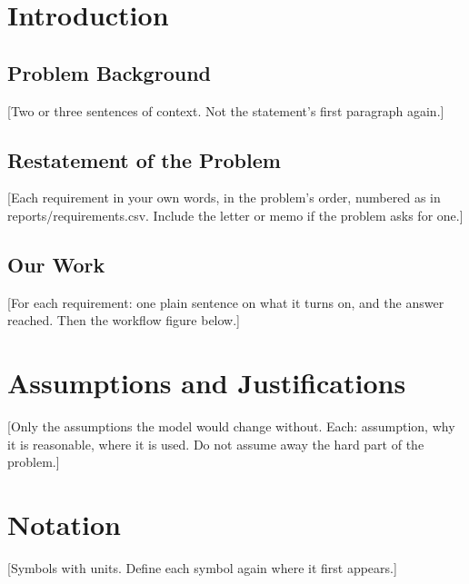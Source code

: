 \documentclass[12pt]{article}
\begin{document}
\section{Introduction}
\subsection{Problem Background}
[Two or three sentences of context. Not the statement's first paragraph again.]

\subsection{Restatement of the Problem}
[Each requirement in your own words, in the problem's order, numbered as in
reports/requirements.csv. Include the letter or memo if the problem asks for one.]

\subsection{Our Work}
[For each requirement: one plain sentence on what it turns on, and the answer reached.
Then the workflow figure below.]


\section{Assumptions and Justifications}
[Only the assumptions the model would change without. Each: assumption, why it is
reasonable, where it is used. Do not assume away the hard part of the problem.]

\section{Notation}
[Symbols with units. Define each symbol again where it first appears.]
\end{document}
